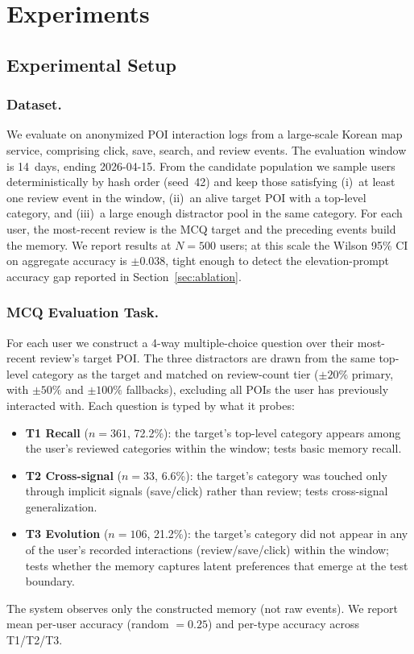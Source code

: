\documentclass[sigconf,review,anonymous]{acmart}
\begin{document}
\section{Experiments}

\subsection{Experimental Setup}
\label{sec:experimental-setup}

\subsubsection{Dataset.}
We evaluate on anonymized POI interaction logs from a large-scale Korean map service, comprising click, save, search, and review events. The evaluation window is 14~days, ending 2026-04-15. From the candidate population we sample users deterministically by hash order (seed~42) and keep those satisfying (i)~at least one review event in the window, (ii)~an alive target POI with a top-level category, and (iii)~a large enough distractor pool in the same category. For each user, the most-recent review is the MCQ target and the preceding events build the memory. We report results at \(N{=}500\) users; at this scale the Wilson 95\% CI on aggregate accuracy is \(\pm 0.038\), tight enough to detect the elevation-prompt accuracy gap reported in Section~\ref{sec:ablation}.

\subsubsection{MCQ Evaluation Task.}
For each user we construct a 4-way multiple-choice question over their most-recent review's target POI. The three distractors are drawn from the same top-level category as the target and matched on review-count tier (\(\pm 20\%\) primary, with \(\pm 50\%\) and \(\pm 100\%\) fallbacks), excluding all POIs the user has previously interacted with. Each question is typed by what it probes:
\begin{itemize}
    \item \textbf{T1 Recall} (\(n{=}361\), 72.2\%): the target's top-level category appears among the user's reviewed categories within the window; tests basic memory recall.
    \item \textbf{T2 Cross-signal} (\(n{=}33\), 6.6\%): the target's category was touched only through implicit signals (save/click) rather than review; tests cross-signal generalization.
    \item \textbf{T3 Evolution} (\(n{=}106\), 21.2\%): the target's category did not appear in any of the user's recorded interactions (review/save/click) within the window; tests whether the memory captures latent preferences that emerge at the test boundary.
\end{itemize}
The system observes only the constructed memory (not raw events). We report mean per-user accuracy (random \(=0.25\)) and per-type accuracy across T1/T2/T3.
\end{document}
